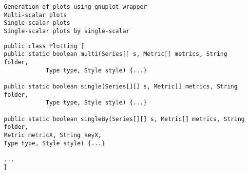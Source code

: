 \begin{verbatim}
Generation of plots using gnuplot wrapper
Multi-scalar plots
Single-scalar plots
Single-scalar plots by single-scalar
\end{verbatim}



\begin{lstlisting}[label={},caption={}]
public class Plotting {
public static boolean multi(Series[] s, Metric[] metrics, String folder,
			Type type, Style style) {...}

public static boolean single(Series[][] s, Metric[] metrics, String folder,
			Type type, Style style) {...}

public static boolean singleBy(Series[][] s, Metric[] metrics, String folder,
Metric metricX, String keyX,
Type type, Style style) {...}

...
}
\end{lstlisting}



